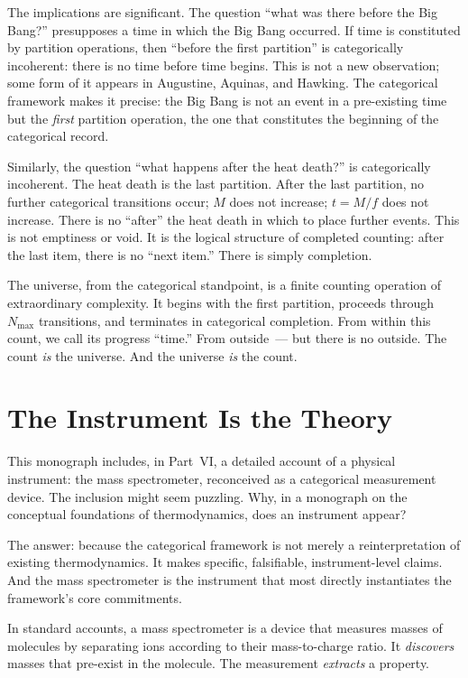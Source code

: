The implications are significant. The question ``what was there before the Big Bang?''
presupposes a time in which the Big Bang occurred. If time is constituted by partition
operations, then ``before the first partition'' is categorically incoherent:
there is no time before time begins. This is not a new observation; some form of
it appears in Augustine, Aquinas, and Hawking. The categorical framework makes it
precise: the Big Bang is not an event in a pre-existing time but the \emph{first}
partition operation, the one that constitutes the beginning of the categorical record.

Similarly, the question ``what happens after the heat death?'' is categorically
incoherent. The heat death is the last partition. After the last partition, no
further categorical transitions occur; $M$ does not increase; $t = M/f$ does not
increase. There is no ``after'' the heat death in which to place further events.
This is not emptiness or void. It is the logical structure of completed counting:
after the last item, there is no ``next item.'' There is simply completion.

The universe, from the categorical standpoint, is a finite counting operation
of extraordinary complexity. It begins with the first partition, proceeds through
$N_{\max}$ transitions, and terminates in categorical completion. From within
this count, we call its progress ``time.'' From outside~--- but there is no outside.
The count \emph{is} the universe. And the universe \emph{is} the count.


\section*{The Instrument Is the Theory}

This monograph includes, in Part~VI, a detailed account of a physical instrument:
the mass spectrometer, reconceived as a categorical measurement device.
The inclusion might seem puzzling. Why, in a monograph on the conceptual foundations
of thermodynamics, does an instrument appear?

The answer: because the categorical framework is not merely a reinterpretation
of existing thermodynamics. It makes specific, falsifiable, instrument-level claims.
And the mass spectrometer is the instrument that most directly instantiates
the framework's core commitments.

In standard accounts, a mass spectrometer is a device that measures masses
of molecules by separating ions according to their mass-to-charge ratio.
It \emph{discovers} masses that pre-exist in the molecule. The measurement
\emph{extracts} a property.

